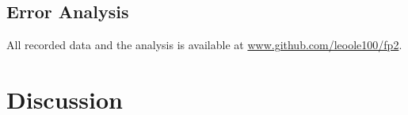 \documentclass[
    parskip=half, 
    twoside=false,
    twocolumn=true,
    fontsize=11pt,
]{scrarticle}
\begin{document}
\subsection{Error Analysis}
\blindtext

All recorded data and the analysis is available at \url{www.github.com/leoole100/fp2}.

\pagebreak
\section{Discussion}
\blindtext
\end{document}
